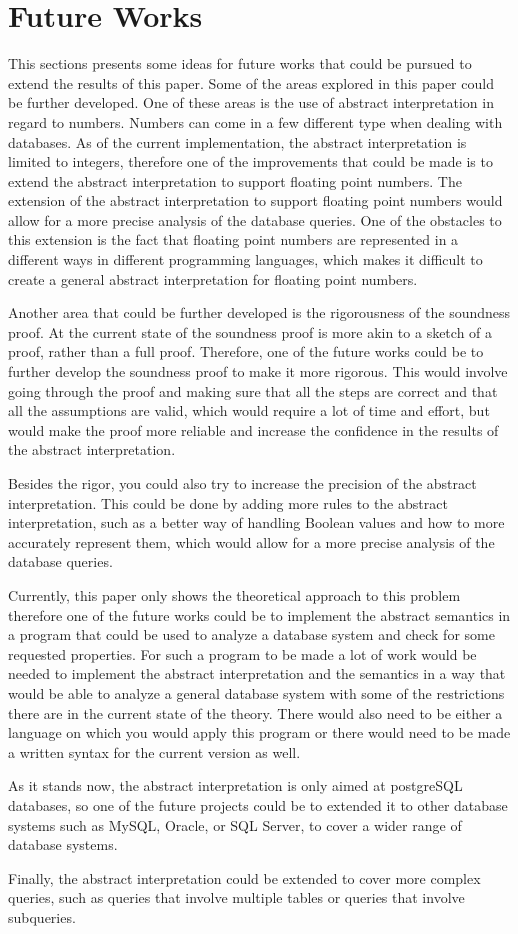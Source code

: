 \section{Future Works}\label{sec:future-works}
This sections presents some ideas for future works that could be pursued to extend the results of this paper.
Some of the areas explored in this paper could be further developed.
One of these areas is the use of abstract interpretation in regard to numbers.
Numbers can come in a few different type when dealing with databases.
As of the current implementation, the abstract interpretation is limited to integers, therefore one of the improvements that could be made is to extend the abstract interpretation to support floating point numbers.
The extension of the abstract interpretation to support floating point numbers would allow for a more precise analysis of the database queries.
One of the obstacles to this extension is the fact that floating point numbers are represented in a different ways in different programming languages, which makes it difficult to create a general abstract interpretation for floating point numbers.

Another area that could be further developed is the rigorousness of the soundness proof.
At the current state of the soundness proof is more akin to a sketch of a proof, rather than a full proof.
Therefore, one of the future works could be to further develop the soundness proof to make it more rigorous.
This would involve going through the proof and making sure that all the steps are correct and that all the assumptions are valid, which would require a lot of time and effort, but would make the proof more reliable and increase the confidence in the results of the abstract interpretation.

Besides the rigor, you could also try to increase the precision of the abstract interpretation.
This could be done by adding more rules to the abstract interpretation, such as a better way of handling Boolean values and how to more accurately represent them, which would allow for a more precise analysis of the database queries.

Currently, this paper only shows the theoretical approach to this problem therefore one of the future works could be to implement the abstract semantics in a program that could be used to analyze a database system and check for some requested properties.
For such a program to be made a lot of work would be needed to implement the abstract interpretation and the semantics in a way that would be able to analyze a general database system with some of the restrictions there are in the current state of the theory.
There would also need to be either a language on which you would apply this program or there would need to be made a written syntax for the current version as well.

As it stands now, the abstract interpretation is only aimed at postgreSQL databases, so one of the future projects could be to extended it to other database systems such as MySQL, Oracle, or SQL Server, to cover a wider range of database systems.

Finally, the abstract interpretation could be extended to cover more complex queries, such as queries that involve multiple tables or queries that involve subqueries.
